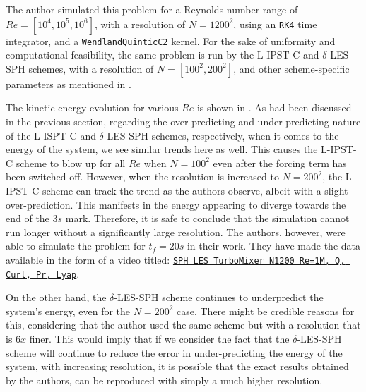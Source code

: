 The author simulated this problem for a Reynolds number range of $Re = [10^4, 10^5, 10^6]$, with a resolution of $N=1200^2$, using an \texttt{RK4} time integrator, and a \texttt{WendlandQuinticC2} kernel.
For the sake of uniformity and computational feasibility, the same problem is run by the L-IPST-C and $\delta$-LES-SPH schemes, with a resolution of $N=[100^2, 200^2]$, and other scheme-specific parameters as mentioned in .

The kinetic energy evolution for various $Re$ is shown in .
As had been discussed in the previous section, regarding the over-predicting and under-predicting nature of the L-ISPT-C and $\delta$-LES-SPH schemes, respectively, when it comes to the energy of the system, we see similar trends here as well.
This causes the L-IPST-C scheme to blow up for all $Re$ when $N=100^2$ even after the forcing term has been switched off. 
However, when the resolution is increased to $N=200^2$, the L-IPST-C scheme can track the trend as the authors observe, albeit with a slight over-prediction. This manifests in the energy appearing to diverge towards the end of the $3s$ mark. Therefore, it is safe to conclude that the simulation cannot run longer without a significantly large resolution. The authors, however, were able to simulate the problem for $t_f=20s$ in their work. They have made the data available in the form of a video titled: \href{https://youtu.be/Qxxuo4K-k6c}{\texttt{SPH LES TurboMixer N1200 Re=1M, Q, Curl, Pr, Lyap}}.

On the other hand, the $\delta$-LES-SPH scheme continues to underpredict the system's energy, even for the $N=200^2$ case. There might be credible reasons for this, considering that the author used the same scheme but with a resolution that is $6x$ finer. This would imply that if we consider the fact that the $\delta$-LES-SPH scheme will continue to reduce the error in under-predicting the energy of the system, with increasing resolution, it is possible that the exact results obtained by the authors, can be reproduced with simply a much higher resolution.

